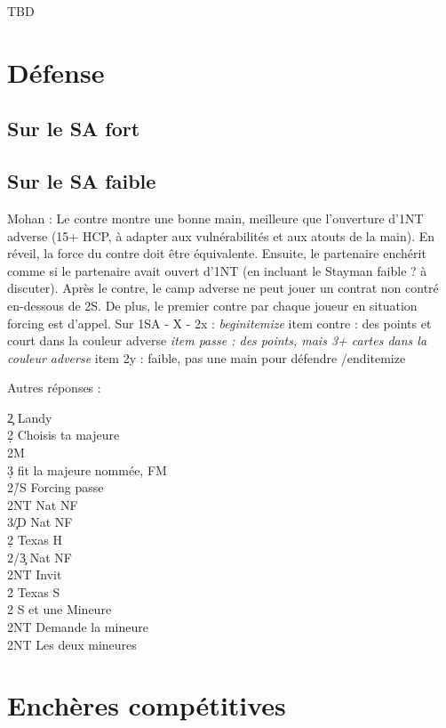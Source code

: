 \documentclass[a4paper]{article}
\begin{document}
TBD

\section{Défense}

\subsection{Sur le SA fort}

\subsection{Sur le SA faible}

Mohan : Le contre montre une bonne main, meilleure que l'ouverture d'1NT adverse (15+ HCP, à adapter aux vulnérabilités et aux atouts de la main). En réveil, la force du contre doit être équivalente.
Ensuite, le partenaire enchérit comme si le partenaire avait ouvert d'1NT (en incluant le Stayman faible ? à discuter).
Après le contre, le camp adverse ne peut jouer un contrat non contré en-dessous de 2S. De plus, le premier contre par chaque joueur en situation forcing est d'appel.
Sur 1SA - X - 2x : 
\emph{begin{itemize}
}item contre : des points et court dans la couleur adverse
\emph{item passe : des points, mais 3+ cartes dans la couleur adverse
}item 2y : faible, pas une main pour défendre
/end{itemize}

Autres réponses :

\begin{bidtable}
2\c \> Landy\+\\
2\d \> Choisis ta majeure\+\\
2M\+\\
3\d \> fit la majeure nommée, FM\-\-\\
2\h/S \> Forcing passe\\
2NT \> Nat NF\\
3\c/D \> Nat NF\-\\
2\d \> Texas H\+\\
2\s/3\c \> Nat NF\\
2NT \> Invit\-\\
2\h \> Texas S\\
2\s \> S et une Mineure\+\\
2NT \> Demande la mineure\-\\
2NT \> Les deux mineures
\end{bidtable}

\section{Enchères compétitives}
\end{document}
